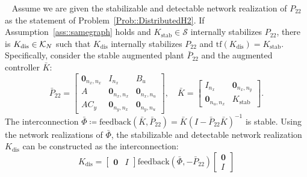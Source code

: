 \begin{thm}\label{thm:samegraphReal}~\cite{Gulnihal2018thesis}
Assume we are given the stabilizable and detectable network realization of \(P_{22}\) as the statement of Problem~\ref{Prob::DistributedH2}. If Assumption~\ref{ass::samegraph} holds and \(K_\mathrm{stab}\in \mathcal{S}\) internally stabilizes \(P_{22}\), there is \(K_\mathrm{dis}\in {\cal K}_N\) such that \(K_\mathrm{dis}\) internally stabilizes \(P_{22}\) and \(\mathrm{tf}(K_\mathrm{dis}) = K_\mathrm{stab}\). Specifically, consider the stable augmented plant \(\bar{P}_{22}\) and the augmented controller \(\bar{K}\):
\begin{equation*}
    \bar{P}_{22} = \left[\begin{array}{c|cc}
        \mathbf{0}_{n_x,n_x} & I_{n_x} & B_u \\
        \hline
        A & \mathbf{0}_{n_x,n_x} &\mathbf{0}_{n_x, n_u} \\
        A C_y & \mathbf{0}_{n_y,n_x} & \mathbf{0}_{n_y,n_u}
    \end{array} \right],\quad
    \bar{K} = \begin{bmatrix}
        I_{n_x} & \mathbf{0}_{n_x, n_y} \\
        \mathbf{0}_{n_u, n_x} & K_\mathrm{stab}
    \end{bmatrix}.
\end{equation*}
The interconnection \(\bar{\Phi} \coloneqq \mathrm{feedback}(\bar{K},\bar{P}_{22}) = \bar{K}(I - \bar{P}_{22} \bar{K})^{-1}\) is stable. Using the network realizations of \(\bar{\Phi}\), the stabilizable and detectable network realization \(K_{\mathrm{dis}}\) can be constructed as the interconnection:
\[
K_{\mathrm{dis}} = \begin{bmatrix}
    \mathbf{0} & I \end{bmatrix} \mathrm{feedback}(\bar{\Phi},- \bar{P}_{22})
    \begin{bmatrix}
    \mathbf{0} \\ I \end{bmatrix}
\]
\end{thm}


